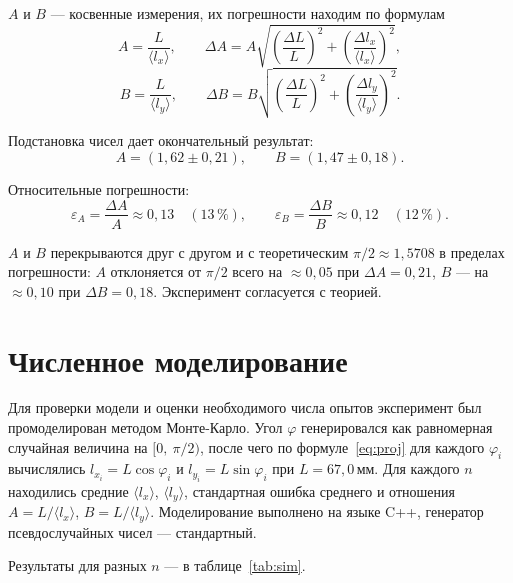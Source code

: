 \documentclass[a4paper, 14pt]{extarticle}
\begin{document}
$A$ и $B$ --- косвенные измерения, их погрешности находим по формулам
\begin{equation}
  A = \frac{L}{\langle l_x \rangle},
  \qquad
  \Delta A = A\sqrt{\left(\frac{\Delta L}{L}\right)^2 + \left(\frac{\Delta l_x}{\langle l_x \rangle}\right)^2},
  \label{eq:A}
\end{equation}
\begin{equation}
  B = \frac{L}{\langle l_y \rangle},
  \qquad
  \Delta B = B\sqrt{\left(\frac{\Delta L}{L}\right)^2 + \left(\frac{\Delta l_y}{\langle l_y \rangle}\right)^2}.
  \label{eq:B}
\end{equation}

Подстановка чисел дает окончательный результат:
\[
  A = (1{,}62 \pm 0{,}21),
  \qquad
  B = (1{,}47 \pm 0{,}18).
\]

Относительные погрешности:
\[
  \varepsilon_A = \frac{\Delta A}{A} \approx 0{,}13 \quad (13\,\%),
  \qquad
  \varepsilon_B = \frac{\Delta B}{B} \approx 0{,}12 \quad (12\,\%).
\]

$A$ и $B$ перекрываются друг с другом и с теоретическим $\pi/2 \approx 1{,}5708$
в пределах погрешности: $A$ отклоняется от $\pi/2$ всего на $\approx 0{,}05$
при $\Delta A = 0{,}21$, $B$ --- на $\approx 0{,}10$ при $\Delta B = 0{,}18$.
Эксперимент согласуется с теорией.

\section*{Численное моделирование}

Для проверки модели и оценки необходимого числа опытов эксперимент был
промоделирован методом Монте-Карло. Угол $\varphi$ генерировался как
равномерная случайная величина на $[0,\ \pi/2)$, после чего по
формуле~\eqref{eq:proj} для каждого $\varphi_i$ вычислялись
$l_{x_i} = L\cos\varphi_i$ и $l_{y_i} = L\sin\varphi_i$ при
$L = 67{,}0\,\text{мм}$. Для каждого $n$ находились средние $\langle l_x\rangle$,
$\langle l_y\rangle$, стандартная ошибка среднего и отношения
$A = L/\langle l_x\rangle$, $B = L/\langle l_y\rangle$. Моделирование
выполнено на языке C++, генератор псевдослучайных чисел --- стандартный.

Результаты для разных $n$ --- в таблице~\ref{tab:sim}.
\end{document}

